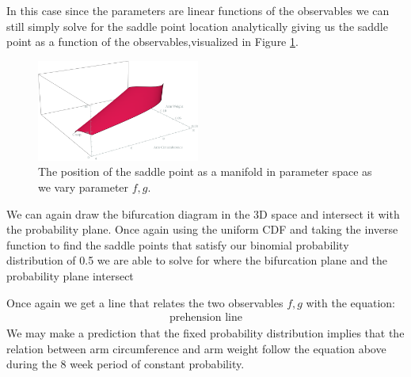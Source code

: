 \documentclass[letterpaper]{article}
\begin{document}
In this case since the parameters are linear functions of the observables we can
still simply solve for the saddle point location analytically giving us the saddle 
point as a function of the observables,visualized in Figure \ref{fig6}. 

\begin{figure}[t]
\begin{center}
\includegraphics[width=2.1in,angle=0]{./saddle_prehension.png}
\caption{The position of the saddle point as a manifold in parameter space as we vary
parameter $f,g$.}
\label{fig6}
\end{center}
\end{figure}

We can again draw the bifurcation diagram in the 
3D space and intersect it with the probability plane. Once again using the uniform CDF
and taking the inverse function to find the saddle points that satisfy 
our binomial probability distribution of 0.5 we are able to solve for where the 
bifurcation plane and the probability plane intersect

Once again we get a line that relates the two observables $f,g$ with the equation:
\begin{eqnarray}
  \text{prehension line}
\end{eqnarray}
We may make a prediction that the fixed probability distribution implies that the
relation between arm circumference and arm weight follow the equation above during
the 8 week period of constant probability.
\end{document}
